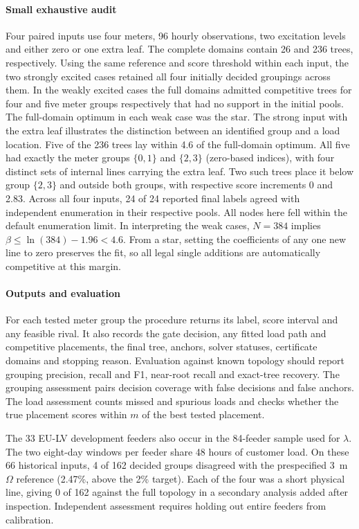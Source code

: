 \documentclass[journal,onecolumn,11pt]{IEEEtran}
\begin{document}
\paragraph*{Small exhaustive audit} Four paired inputs use four meters, 96 hourly observations, two excitation
levels and either zero or one extra leaf. The complete domains contain 26 and 236 trees, respectively. Using the same
reference and score threshold within each input, the two strongly excited cases retained all four initially decided
groupings across them. In the weakly excited cases the full domains admitted competitive trees for four and five
meter groups respectively that had no support in the initial pools. The full-domain optimum in each weak case was
the star. The strong input with the extra leaf illustrates the distinction between an identified group and a load location.
Five of the 236 trees lay within 4.6 of the full-domain optimum. All five had exactly the meter groups
$\{0,1\}$ and $\{2,3\}$ (zero-based indices), with four distinct sets of internal lines carrying the extra leaf.
Two such trees place it below group $\{2,3\}$ and outside both groups, with respective score increments 0
and 2.83. Across all four inputs, 24 of 24 reported final labels agreed with independent enumeration in their
respective pools. All nodes here fell within the default enumeration limit. In interpreting the weak cases,
$N=384$ implies $\beta\le\ln(384)-1.96<4.6$. From a star, setting the coefficients of any one new line to zero
preserves the fit, so all legal single additions are automatically competitive at this margin.

\paragraph*{Outputs and evaluation}
For each tested meter group the procedure returns its label, score interval and any feasible rival. It also records
the gate decision, any fitted load path and competitive placements, the final tree, anchors, solver statuses,
certificate domains and stopping reason. Evaluation against known topology should report grouping precision,
recall and F1, near-root recall and exact-tree recovery. The grouping assessment pairs decision coverage with
false decisions and false anchors. The load assessment counts missed and spurious loads and checks whether
the true placement scores within $m$ of the best tested placement.

The 33 EU-LV development feeders also occur in the 84-feeder sample used for $\lambda$. The two eight-day
windows per feeder share 48 hours of customer load. On these 66 historical inputs, 4 of 162 decided groups
disagreed with the prespecified 3~m$\Omega$ reference (2.47\%, above the 2\% target). Each of the four was a
short physical line, giving 0 of 162 against the full topology in a secondary analysis added after inspection.
Independent assessment requires holding out entire feeders from calibration.
\end{document}
